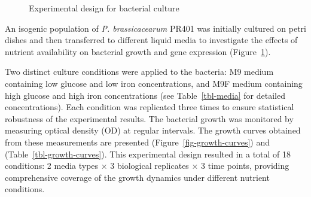 \documentclass[
  11pt,
  a4paper,
]{report}
\begin{document}
\begin{figure}


\caption{\label{fig-experimental-design}Experimental design for
bacterial culture}

\end{figure}%

An isogenic population of \emph{P. brassicacearum} PR401 was initially
cultured on petri dishes and then transferred to different liquid media
to investigate the effects of nutrient availability on bacterial growth
and gene expression (Figure~\ref{fig-experimental-design}).

Two distinct culture conditions were applied to the bacteria: M9 medium
containing low glucose and low iron concentrations, and M9F medium
containing high glucose and high iron concentrations (see
Table~\ref{tbl-media} for detailed concentrations). Each condition was
replicated three times to ensure statistical robustness of the
experimental results. The bacterial growth was monitored by measuring
optical density (OD) at regular intervals. The growth curves obtained
from these measurements are presented (Figure~\ref{fig-growth-curves})
and (Table~\ref{tbl-growth-curves}). This experimental design resulted
in a total of 18 conditions: 2 media types × 3 biological replicates × 3
time points, providing comprehensive coverage of the growth dynamics
under different nutrient conditions.
\end{document}

